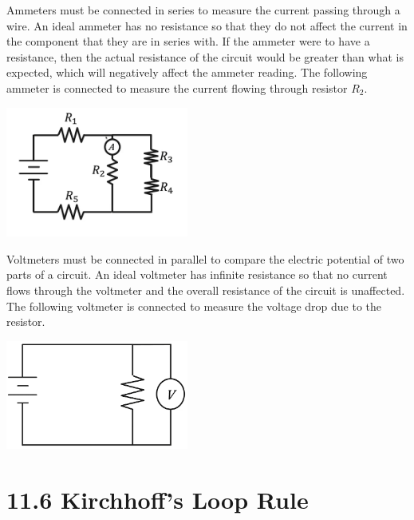 \documentclass[12pt, titlepage]{article}
\begin{document}
Ammeters must be connected in series to measure the current passing through a wire. An ideal ammeter has no resistance so that they do not affect the current in the component that they are in series with. If the ammeter were to have a resistance, then the actual resistance of the circuit would be greater than what is expected, which will negatively affect the ammeter reading. The following ammeter is connected to measure the current flowing through resistor $R_2$.
\begin{center}
    \includegraphics*[width=6cm]{media/ammeter.png}
\end{center}
Voltmeters must be connected in parallel to compare the electric potential of two parts of a circuit. An ideal voltmeter has infinite resistance so that no current flows through the voltmeter and the overall resistance of the circuit is unaffected. The following voltmeter is connected to measure the voltage drop due to the resistor.
\begin{center}
    \includegraphics*[width=6cm]{media/voltmeter.png}
\end{center}

\section*{11.6 Kirchhoff's Loop Rule}
\end{document}
